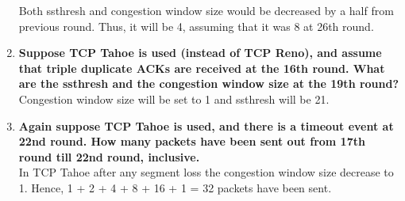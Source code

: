 \documentclass[11pt]{article}
\begin{document}
\begin{enumerate}[label=(\alph*)]
        Both ssthresh and congestion window size would be decreased by a half from previous round. Thus, it will be 4, assuming that it was 8 at 26th round.
        \item \textbf{Suppose TCP Tahoe is used (instead of TCP Reno), and assume that triple duplicate ACKs are received at the 16th round. What are the ssthresh and the congestion window size at the 19th round?} \\
        Congestion window size will be set to 1 and ssthresh will be 21.
        \item \textbf{Again suppose TCP Tahoe is used, and there is a timeout event at 22nd round. How many packets have been sent out from 17th round till 22nd round, inclusive.} \\
        In TCP Tahoe after any segment loss the congestion window size decrease to 1.
        Hence, 1 + 2 + 4 + 8 + 16 + 1 = 32 packets have been sent.
    \end{enumerate}
    \newpage
\end{document}
